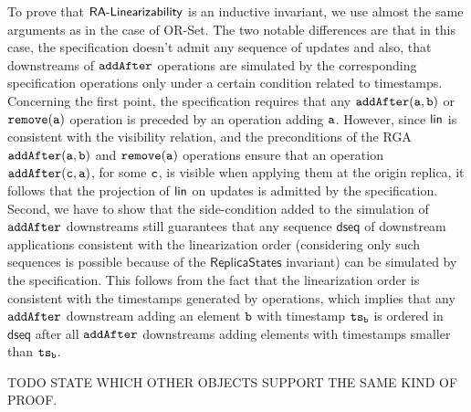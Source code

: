 To prove that $\mathsf{RA\text{-}Linearizability{}}$ is an inductive invariant, we use almost the same arguments as in the case of OR-Set. The two notable differences are that in this case, the specification doesn't admit any sequence of updates and also, that downstreams of ${\tt addAfter}$ operations are simulated by the corresponding specification operations only under a certain condition related to timestamps. Concerning the first point, the specification requires that any $\alabelshort[{\tt addAfter}]{a,b}$ or $\alabelshort[{\tt remove}]{a}$ operation is preceded by an operation adding ${\tt a}$. However, since $\mathsf{lin}$ is consistent with the visibility relation, and the preconditions of the RGA $\alabelshort[{\tt addAfter}]{a,b}$ and $\alabelshort[{\tt remove}]{a}$ operations ensure that an operation $\alabelshort[{\tt addAfter}]{c,a}$, for some ${\tt c}$, is visible when applying them at the origin replica, it follows that the projection of $\mathsf{lin}$ on updates is admitted by the specification. Second, we have to show that the side-condition added to the simulation of ${\tt addAfter}$ downstreams still guarantees that any sequence $\mathsf{dseq}$ of downstream applications consistent with the linearization order (considering only such sequences is possible because of the $\mathsf{ReplicaStates}$ invariant) can be simulated by the specification. This follows from the fact that the linearization order is consistent with the timestamps generated by operations, which implies that any ${\tt addAfter}$ downstream adding an element ${\tt b}$ with timestamp $\mathtt{ts}_{\tt b}$ is ordered in $\mathsf{dseq}$ after all ${\tt addAfter}$ downstreams adding elements with timestamps smaller than $\mathtt{ts}_{\tt b}$.

TODO STATE WHICH OTHER OBJECTS SUPPORT THE SAME KIND OF PROOF.


